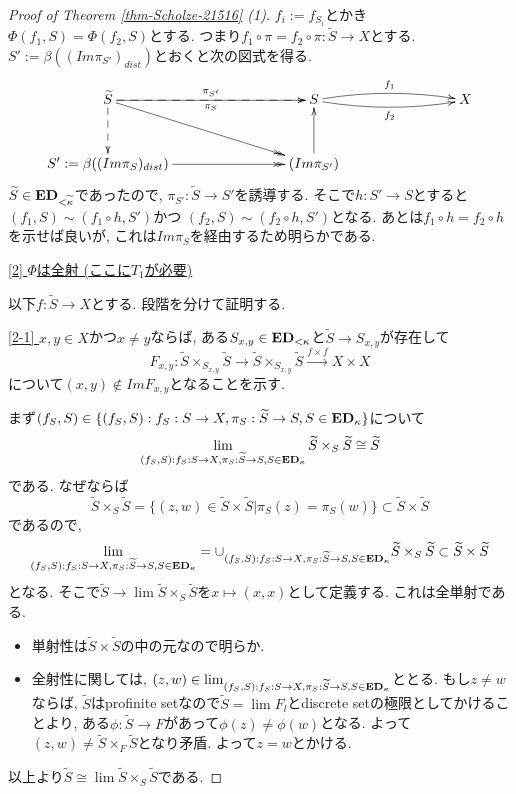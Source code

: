 \documentclass[dvipdfmx,a4paper,11pt]{article}
\theoremstyle{definition}
\begin{document}
\begin{proof}[Proof of Theorem \ref{thm-Scholze-21516} (1)]
$f_i := f_{S_i}$とかき
$\Phi(f_1, S) = \Phi(f_2, S)$とする.
つまり$f_1 \circ \pi = f_2 \circ \pi : \widetilde{S} \to X$とする. 
$S' := \beta((Im \pi_{S'})_{dist})$とおくと次の図式を得る. 
\begin{equation*}
\xymatrix@C=80pt@R=30pt{
\widetilde{S}\ar@{-->}[r]^{\pi_{S'}}
\ar@{-->}[d]
\ar@{->>}[rd]
\ar@{->}[r]_{\pi_{S}}
&S
 \ar@/^5pt/[r]^{f_1}
  \ar@/_5pt/[r]_{f_2}
&X
\\
S' := \beta((Im \pi_{S})_{dist}) \ar@{->>}[r]
&(Im \pi_{S'})\ar@{->}[u]
&
 \\   
}
\end{equation*}
$\widetilde{S} \in {\bf ED}_{< \widetilde{\kappa}}$であったので, 
$\pi_{S'} : \widetilde{S} \to S'$を誘導する.
そこで$h : S' \to S$とすると
$(f_1, S) \sim  (f_1 \circ h,S')$かつ
$(f_2, S) \sim  (f_2 \circ h,S')$となる.
あとは$f_1 \circ h = f_2 \circ h$を示せば良いが, これは$Im \pi_{S}$を経由するため明らかである. 

\underline{[2] $\Phi$は全射 (ここに$T_1$が必要) }

以下$f : \widetilde{S} \to X$とする. 
段階を分けて証明する. 

\underline{[2-1] } $x,y \in X$かつ$x \neq y$ならば, ある$S_{x, y} \in {\bf ED}_{<\kappa}$と$ \widetilde{S} \to S_{x,y}$が存在して
$$
F_{x,y} : \widetilde{S} \times_{S_{x,y}}\widetilde{S} 
\longrightarrow
\widetilde{S} \times_{S_{x,y}}\widetilde{S} 
\overset{f \times f}{\longrightarrow}
X \times X
$$
について$(x,y)\not \in Im F_{x,y}$となることを示す. 

まず$(f_S, S) \in \{(f_S, S) : f_S : S \to X, \pi_{S}: \widetilde{S} \to S, S \in {\bf ED}_{\kappa} \}$について
$$
\lim_{(f_S, S) : f_S : S \to X, \pi_{S}: \widetilde{S} \to S, S \in {\bf ED}_{\kappa} }
 \widetilde{S} \times_{S} \widetilde{S}
 \cong 
 \widetilde{S} 
$$
である. なぜならば
$$ \widetilde{S} \times_{S} \widetilde{S}
=
\{ (z,w) \in \widetilde{S} \times \widetilde{S} | \pi_{S}(z) = \pi_{S}(w)\} \subset \widetilde{S} \times \widetilde{S}
$$
であるので, 
$$
\lim_{(f_S, S) : f_S : S \to X, \pi_{S}: \widetilde{S} \to S, S \in {\bf ED}_{\kappa} }
= \cup_{(f_S, S) : f_S : S \to X, \pi_{S}: \widetilde{S} \to S, S \in {\bf ED}_{\kappa} } \widetilde{S} \times_{S} \widetilde{S}
\subset \widetilde{S} \times \widetilde{S}
$$
となる. そこで$\widetilde{S} \to  \lim \widetilde{S} \times_{S} \widetilde{S}$を$x \mapsto (x,x)$として定義する. これは全単射である.
\begin{itemize}
\item 単射性は$\widetilde{S} \times \widetilde{S}$の中の元なので明らか.
 \item 全射性に関しては, $( z, w )\in \lim_{(f_S, S) : f_S : S \to X, \pi_{S}: \widetilde{S} \to S, S \in {\bf ED}_{\kappa} }$ととる. 
もし$z \neq w$ならば, $\widetilde{S}$はprofinite setなので$\widetilde{S} = \lim F_l$とdiscrete setの極限としてかけることより, ある$\phi : \widetilde{S} \to F$があって$\phi(z) \neq \phi(w)$となる. 
よって$(z, w) \neq \widetilde{S} \times_{F} \widetilde{S}$となり矛盾. よって$z=w$とかける. 
\end{itemize}
以上より$\widetilde{S} \cong \lim \widetilde{S} \times_{S} \widetilde{S}$である.


\end{proof}
\end{document}
